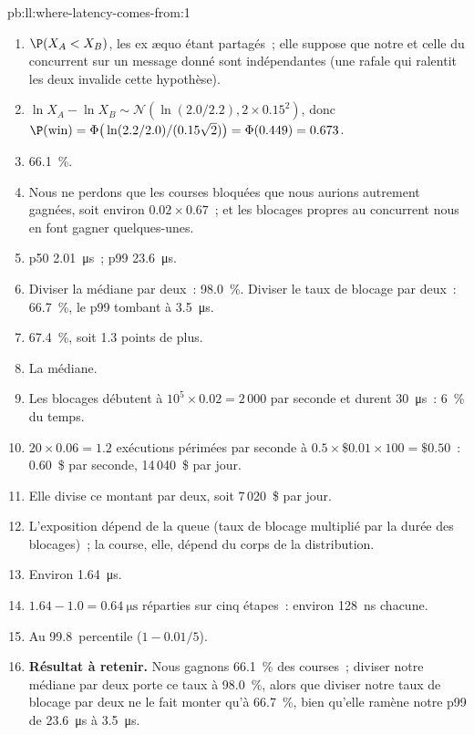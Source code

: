\begin{solution}{pb:ll:where-latency-comes-from:1}
\begin{enumerate} \sloppy
\item $\P(X_A < X_B)$, les ex æquo étant partagés~; elle suppose que notre  et celle du concurrent sur un message donné sont
indépendantes (une rafale qui ralentit les deux invalide cette hypothèse).
\item $\ln X_A - \ln X_B \sim \mathcal N(\ln(2.0/2.2), 2\times0.15^2)$, donc $\P(\text{win}) =
\Phi\big(\ln(2.2/2.0)/(0.15\sqrt2)\big) = \Phi(0.449) = 0.673$.
\item 66.1~\%.
\item Nous ne perdons que les courses bloquées que nous aurions autrement gagnées, soit environ $0.02 \times 0.67$~; et les blocages propres au concurrent
nous en font gagner quelques-unes.
\item p50 \qty{2.01}{\micro\second}~; p99 \qty{23.6}{\micro\second}.
\item Diviser la médiane par deux~: 98.0~\%. Diviser le taux de blocage par deux~: 66.7~\%, le p99 tombant à \qty{3.5}{\micro\second}.
\item 67.4~\%, soit 1.3 points de plus.
\item La médiane.
\item Les blocages débutent à $10^5 \times 0.02 = 2\,000$ par seconde et durent \qty{30}{\micro\second}~: 6~\% du temps.
\item $20 \times 0.06 = 1.2$ exécutions périmées par seconde à $0.5 \times \$0.01 \times 100 = \$0.50$~: 0.60~\$ par seconde,
14\,040~\$ par jour.
\item Elle divise ce montant par deux, soit 7\,020~\$ par jour.
\item L'exposition dépend de la queue (taux de blocage multiplié par la durée des blocages)~; la course, elle, dépend du corps de la distribution.
\item Environ \qty{1.64}{\micro\second}.
\item $1.64 - 1.0 = \qty{0.64}{\micro\second}$ réparties sur cinq étapes~: environ \qty{128}{\nano\second} chacune.
\item Au 99.8~percentile ($1 - 0.01/5$).
\item \textbf{Résultat à retenir.} Nous gagnons 66.1~\% des courses~; diviser notre médiane par deux porte ce taux à 98.0~\%, alors que diviser notre taux de blocage par deux ne le fait monter
qu'à 66.7~\%, bien qu'elle ramène notre p99 de \qty{23.6}{\micro\second} à \qty{3.5}{\micro\second}.

\end{enumerate}
\end{solution}
